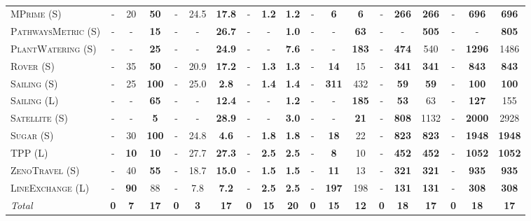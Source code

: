 \documentclass[11pt,landscape]{article}
\begin{document}
\begin{table*}[tb]
{\begin{tabular}{|l||ccc||ccc||ccc||ccc||ccc||ccc||}
\textsc{MPrime} (S)&-&20&\textbf{50}&-&24.5&\textbf{17.8}&-&\textbf{1.2}&\textbf{1.2}&-&\textbf{6}&\textbf{6}&-&\textbf{266}&\textbf{266}&-&\textbf{696}&\textbf{696}\\
\textsc{PathwaysMetric} (S)&-&-&\textbf{15}&-&-&\textbf{26.7}&-&-&\textbf{1.0}&-&-&\textbf{63}&-&-&\textbf{505}&-&-&\textbf{805}\\
\textsc{PlantWatering} (S)&-&-&\textbf{25}&-&-&\textbf{24.9}&-&-&\textbf{7.6}&-&-&\textbf{183}&-&\textbf{474}&540&-&\textbf{1296}&1486\\
\textsc{Rover} (S)&-&35&\textbf{50}&-&20.9&\textbf{17.2}&-&\textbf{1.3}&\textbf{1.3}&-&\textbf{14}&15&-&\textbf{341}&\textbf{341}&-&\textbf{843}&\textbf{843}\\
\textsc{Sailing} (S)&-&25&\textbf{100}&-&25.0&\textbf{2.8}&-&\textbf{1.4}&\textbf{1.4}&-&\textbf{311}&432&-&\textbf{59}&\textbf{59}&-&\textbf{100}&\textbf{100}\\
\textsc{Sailing} (L)&-&-&\textbf{65}&-&-&\textbf{12.4}&-&-&\textbf{1.2}&-&-&\textbf{185}&-&\textbf{53}&63&-&\textbf{127}&155\\
\textsc{Satellite} (S)&-&-&\textbf{5}&-&-&\textbf{28.9}&-&-&\textbf{3.0}&-&-&\textbf{21}&-&\textbf{808}&1132&-&\textbf{2000}&2928\\
\textsc{Sugar} (S)&-&30&\textbf{100}&-&24.8&\textbf{4.6}&-&\textbf{1.8}&\textbf{1.8}&-&\textbf{18}&22&-&\textbf{823}&\textbf{823}&-&\textbf{1948}&\textbf{1948}\\
\textsc{TPP} (L)&-&\textbf{10}&\textbf{10}&-&27.7&\textbf{27.3}&-&\textbf{2.5}&\textbf{2.5}&-&\textbf{8}&10&-&\textbf{452}&\textbf{452}&-&\textbf{1052}&\textbf{1052}\\
\textsc{ZenoTravel} (S)&-&40&\textbf{55}&-&18.7&\textbf{15.0}&-&\textbf{1.5}&\textbf{1.5}&-&\textbf{11}&13&-&\textbf{321}&\textbf{321}&-&\textbf{935}&\textbf{935}\\
\textsc{LineExchange} (L)&-&\textbf{90}&88&-&7.8&\textbf{7.2}&-&\textbf{2.5}&\textbf{2.5}&-&\textbf{197}&198&-&\textbf{131}&\textbf{131}&-&\textbf{308}&\textbf{308}
\\\hline
\textit{Total}&\textbf{0}&\textbf{7}&\textbf{17}&\textbf{0}&\textbf{3}&\textbf{17}&\textbf{0}&\textbf{15}&\textbf{20}&\textbf{0}&\textbf{15}&\textbf{12}&\textbf{0}&\textbf{18}&\textbf{17}&\textbf{0}&\textbf{18}&\textbf{17}\\\hline

        \end{tabular}}
        \caption{}
        \label{tab:experiments}
        \end{table*}
        
\end{document}
